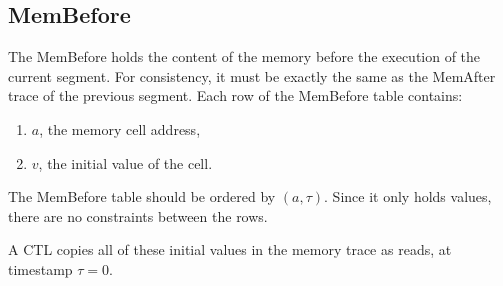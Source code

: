 \subsection{MemBefore}
\label{mem-before}

The MemBefore holds the content of the memory before the execution of the current segment. For consistency, it must be exactly the same as the MemAfter trace
of the previous segment.
Each row of the MemBefore table contains:

\begin{enumerate}
  \item $a$, the memory cell address,
  \item $v$, the initial value of the cell.
\end{enumerate}
The MemBefore table should be ordered by $(a, \tau)$. Since it only holds values, there are no constraints between the rows.

A CTL copies all of these initial values in the memory trace as reads, at timestamp $\tau = 0$.